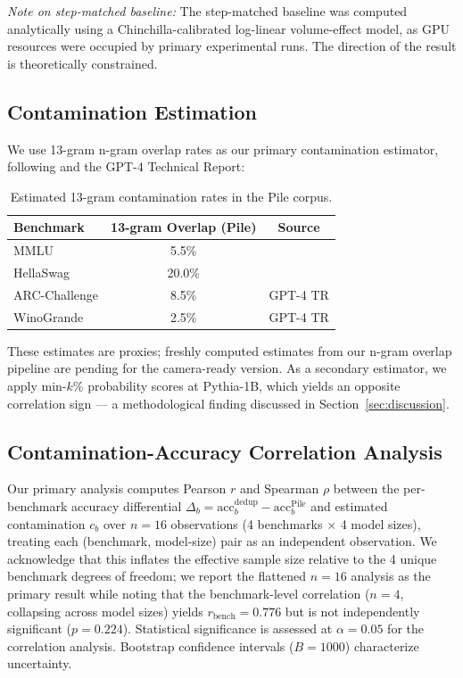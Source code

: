 \textit{Note on step-matched baseline:} The step-matched baseline was computed analytically using a
Chinchilla-calibrated log-linear volume-effect model, as GPU resources were occupied
by primary experimental runs. The direction of the result is theoretically constrained.

\subsection{Contamination Estimation}

We use 13-gram n-gram overlap rates as our primary contamination estimator, following
\citet{Lee2022Deduplicating} and the GPT-4 Technical Report:

\begin{table}[h]
\centering
\caption{Estimated 13-gram contamination rates in the Pile corpus.}
\label{tab:contamination}
\begin{tabular}{lcc}
\toprule
Benchmark & 13-gram Overlap (Pile) & Source \\
\midrule
MMLU & 5.5\% & \citet{Lee2022Deduplicating} \\
HellaSwag & 20.0\% & \citet{Lee2022Deduplicating} \\
ARC-Challenge & 8.5\% & GPT-4 TR \\
WinoGrande & 2.5\% & GPT-4 TR \\
\bottomrule
\end{tabular}
\end{table}

These estimates are proxies; freshly computed estimates from our n-gram overlap pipeline are
pending for the camera-ready version. As a secondary estimator, we apply min-$k$\%
probability scores \citep{Shi2023Detecting} at Pythia-1B, which yields an opposite
correlation sign --- a methodological finding discussed in Section~\ref{sec:discussion}.

\subsection{Contamination-Accuracy Correlation Analysis}

Our primary analysis computes Pearson $r$ and Spearman $\rho$ between the per-benchmark
accuracy differential $\Delta_b = \text{acc}^{\text{dedup}}_b - \text{acc}^{\text{Pile}}_b$
and estimated contamination $c_b$ over $n = 16$ observations (4 benchmarks $\times$
4 model sizes), treating each (benchmark, model-size) pair as an independent observation.
We acknowledge that this inflates the effective sample size relative to the 4 unique
benchmark degrees of freedom; we report the flattened $n = 16$ analysis as the primary
result while noting that the benchmark-level correlation ($n = 4$, collapsing across
model sizes) yields $r_{\text{bench}} = 0.776$ but is not independently significant
($p = 0.224$). Statistical significance is assessed at $\alpha = 0.05$ for the
correlation analysis. Bootstrap confidence intervals ($B = 1000$) characterize uncertainty.

